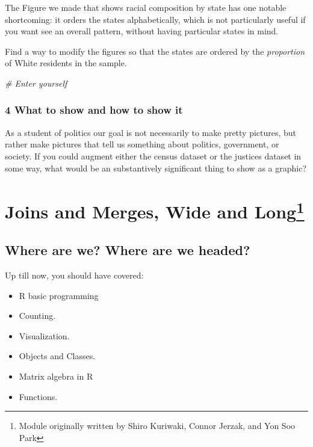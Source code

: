 \documentclass[]{book}
\newenvironment{Shaded}{\begin{snugshade}}{\end{snugshade}}
\newcommand{\CommentTok}[1]{\textcolor[rgb]{0.56,0.35,0.01}{\textit{#1}}}
\providecommand{\tightlist}{%
  \setlength{\itemsep}{0pt}\setlength{\parskip}{0pt}}
\let\rmarkdownfootnote\footnote%
\def\footnote{\protect\rmarkdownfootnote}
\theoremstyle{definition}
\theoremstyle{definition}
\theoremstyle{definition}
\theoremstyle{remark}
\begin{document}
The Figure we made that shows racial composition by state has one
notable shortcoming: it orders the states alphabetically, which is not
particularly useful if you want see an overall pattern, without having
particular states in mind.

Find a way to modify the figures so that the states are ordered by the
\emph{proportion} of White residents in the sample.

\begin{Shaded}
\begin{Highlighting}[]
\CommentTok{# Enter yourself}
\end{Highlighting}
\end{Shaded}

\subsection*{4 What to show and how to show
it}\label{what-to-show-and-how-to-show-it}

As a student of politics our goal is not necessarily to make pretty
pictures, but rather make pictures that tell us something about
politics, government, or society. If you could augment either the census
dataset or the justices dataset in some way, what would be an
substantively significant thing to show as a graphic?

\chapter[Joins and Merges, Wide and Long]{\texorpdfstring{Joins and
Merges, Wide and Long\footnote{Module originally written by Shiro
  Kuriwaki, Connor Jerzak, and Yon Soo Park}}{Joins and Merges, Wide and Long}}\label{dempeace}

\section*{Where are we? Where are we
headed?}\label{where-are-we-where-are-we-headed-4}

Up till now, you should have covered:

\begin{itemize}
\tightlist
\item
  R basic programming
\item
  Counting.
\item
  Visualization.
\item
  Objects and Classes.
\item
  Matrix algebra in R
\item
  Functions.
\end{itemize}
\end{document}
